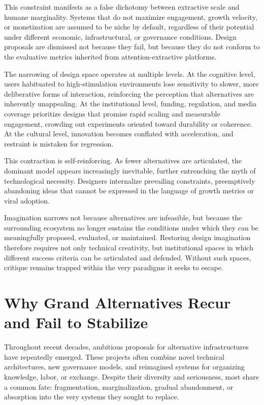 \documentclass[12pt]{article}
\begin{document}
This constraint manifests as a false dichotomy between extractive scale and humane marginality. Systems that do not maximize engagement, growth velocity, or monetization are assumed to be niche by default, regardless of their potential under different economic, infrastructural, or governance conditions. Design proposals are dismissed not because they fail, but because they do not conform to the evaluative metrics inherited from attention-extractive platforms.

The narrowing of design space operates at multiple levels. At the cognitive level, users habituated to high-stimulation environments lose sensitivity to slower, more deliberative forms of interaction, reinforcing the perception that alternatives are inherently unappealing. At the institutional level, funding, regulation, and media coverage prioritize designs that promise rapid scaling and measurable engagement, crowding out experiments oriented toward durability or coherence. At the cultural level, innovation becomes conflated with acceleration, and restraint is mistaken for regression.

This contraction is self-reinforcing. As fewer alternatives are articulated, the dominant model appears increasingly inevitable, further entrenching the myth of technological necessity. Designers internalize prevailing constraints, preemptively abandoning ideas that cannot be expressed in the language of growth metrics or viral adoption.

Imagination narrows not because alternatives are infeasible, but because the surrounding ecosystem no longer sustains the conditions under which they can be meaningfully proposed, evaluated, or maintained. Restoring design imagination therefore requires not only technical creativity, but institutional spaces in which different success criteria can be articulated and defended. Without such spaces, critique remains trapped within the very paradigms it seeks to escape.

\section{Why Grand Alternatives Recur and Fail to Stabilize}

Throughout recent decades, ambitious proposals for alternative infrastructures have repeatedly emerged. These projects often combine novel technical architectures, new governance models, and reimagined systems for organizing knowledge, labor, or exchange. Despite their diversity and seriousness, most share a common fate: fragmentation, marginalization, gradual abandonment, or absorption into the very systems they sought to replace.
\end{document}
